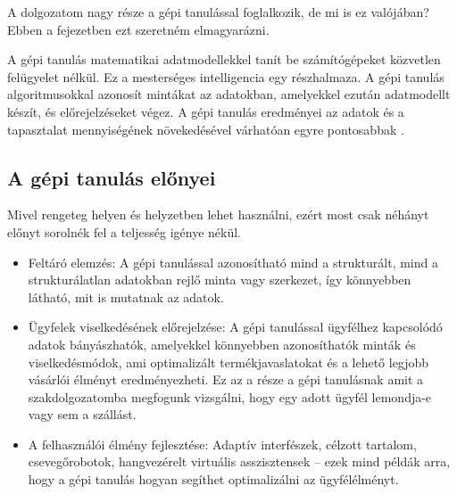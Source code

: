 A dolgozatom nagy része a gépi tanulással foglalkozik, de mi is ez valójában? Ebben a fejezetben ezt szeretném elmagyarázni.

A gépi tanulás matematikai adatmodellekkel tanít be számítógépeket közvetlen felügyelet nélkül. Ez a mesterséges intelligencia egy részhalmaza. A gépi tanulás algoritmusokkal azonosít mintákat az adatokban, amelyekkel ezután adatmodellt készít, és előrejelzéseket végez. A gépi tanulás eredményei az adatok és a tapasztalat mennyiségének növekedésével várhatóan egyre pontosabbak \cite{machinelearningbasics}.

\subsection{A gépi tanulás előnyei}
Mivel rengeteg helyen és helyzetben lehet használni, ezért most csak néhányt előnyt sorolnék fel a teljesség igénye nékül.
\begin{itemize}
    \item Feltáró elemzés: A gépi tanulással azonosítható mind a strukturált, mind a strukturálatlan adatokban rejlő minta vagy szerkezet, így könnyebben látható, mit is mutatnak az adatok.
    \item Ügyfelek viselkedésének előrejelzése: A gépi tanulással ügyfélhez kapcsolódó adatok bányászhatók, amelyekkel könnyebben azonosíthatók minták és viselkedésmódok, ami optimalizált termékjavaslatokat és a lehető legjobb vásárlói élményt eredményezheti. Ez az a része a gépi tanulásnak amit a szakdolgozatomba megfogunk vizsgálni, hogy egy adott ügyfél lemondja-e vagy sem a szállást.
    \item A felhasználói élmény fejlesztése: Adaptív interfészek, célzott tartalom, csevegőrobotok, hangvezérelt virtuális asszisztensek – ezek mind példák arra, hogy a gépi tanulás hogyan segíthet optimalizálni az ügyfélélményt\cite{machinelearningbasics}.
\end{itemize}

